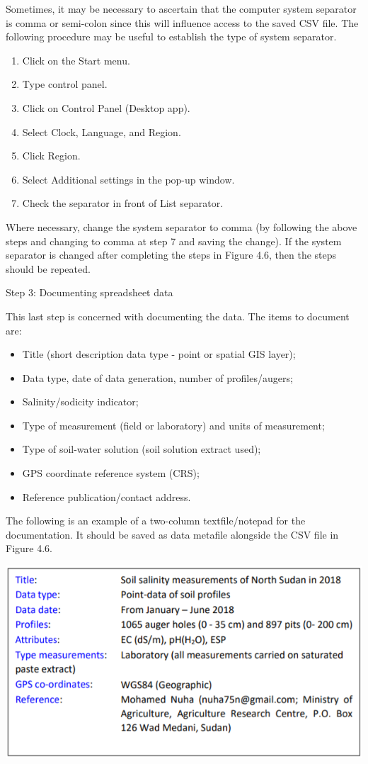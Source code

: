 \documentclass[
  10pt,
  b5paper,
]{book}
\providecommand{\tightlist}{%
  \setlength{\itemsep}{0pt}\setlength{\parskip}{0pt}}
\begin{document}
Sometimes, it may be necessary to ascertain that the computer system separator is comma or semi-colon since this will influence access to the saved CSV file. The following procedure may be useful to establish the type of system separator.

\begin{enumerate}
\def\labelenumi{\arabic{enumi}.}
\tightlist
\item
  Click on the Start menu.
\item
  Type control panel.
\item
  Click on Control Panel (Desktop app).
\item
  Select Clock, Language, and Region.
\item
  Click Region.
\item
  Select Additional settings in the pop-up window.
\item
  Check the separator in front of List separator.
\end{enumerate}

Where necessary, change the system separator to comma (by following the above steps and changing to comma at step 7 and saving the change). If the system separator is changed after completing the steps in Figure 4.6, then the steps should be repeated.

Step 3: Documenting spreadsheet data

This last step is concerned with documenting the data. The items to document are:

\begin{itemize}
\tightlist
\item
  Title (short description data type - point or spatial GIS layer);
\item
  Data type, date of data generation, number of profiles/augers;
\item
  Salinity/sodicity indicator;
\item
  Type of measurement (field or laboratory) and units of measurement;
\item
  Type of soil-water solution (soil solution extract used);
\item
  GPS coordinate reference system (CRS);
\item
  Reference publication/contact address.
\end{itemize}

The following is an example of a two-column textfile/notepad for the documentation. It should be saved as data metafile alongside the CSV file in Figure 4.6.

\includegraphics{figures/tables/table_ex.PNG}
\end{document}
